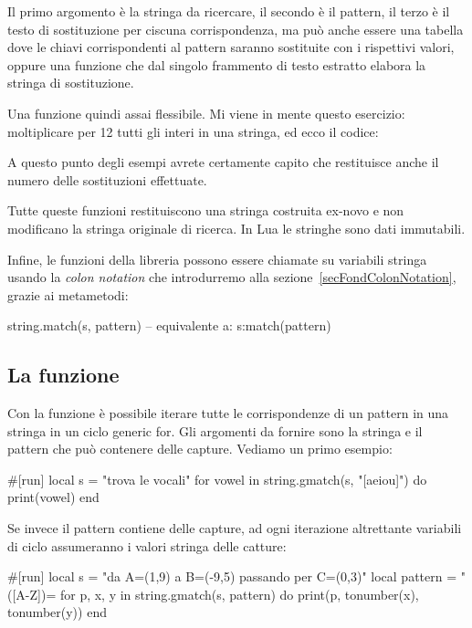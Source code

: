 Il primo argomento è la stringa da ricercare, il secondo è il pattern, il terzo
è il testo di sostituzione per ciscuna corrispondenza, ma può anche essere una
tabella dove le chiavi corrispondenti al pattern saranno sostituite con i
rispettivi valori, oppure una funzione che dal singolo frammento di testo
estratto elabora la stringa di sostituzione.

Una funzione quindi assai flessibile. Mi viene in mente questo esercizio:
moltiplicare per 12 tutti gli interi in una stringa, ed ecco il codice:

A questo punto degli esempi avrete certamente capito che  restituisce
anche il numero delle sostituzioni effettuate.

Tutte queste funzioni restituiscono una stringa costruita ex-novo e non
modificano la stringa originale di ricerca. In Lua le stringhe sono dati
immutabili.

Infine, le funzioni della libreria  possono essere chiamate su
variabili stringa usando la \emph{colon notation} che introdurremo alla
sezione~\ref{secFondColonNotation}, grazie ai metametodi:
\begin{lines}
string.match(s, pattern) -- equivalente a:
s:match(pattern)
\end{lines}


\subsection{La funzione }

Con la funzione  è possibile iterare
tutte le corrispondenze di un pattern in una stringa in un ciclo generic for.
Gli argomenti da fornire sono la stringa e il pattern che può contenere delle
capture. Vediamo un primo esempio:
\begin{lines}
#[run]
local s = "trova le vocali"
for vowel in string.gmatch(s, "[aeiou]") do
    print(vowel)
end
\end{lines}

Se invece il pattern contiene delle capture, ad ogni iterazione altrettante
variabili di ciclo assumeranno i valori stringa delle catture:
\begin{lines}
#[run]
local s = "da A=(1,9) a B=(-9,5) passando per C=(0,3)"
local pattern = "([A-Z])=%
for p, x, y in string.gmatch(s, pattern) do
    print(p, tonumber(x), tonumber(y))
end
\end{lines}


